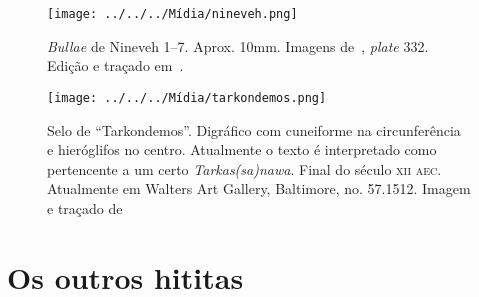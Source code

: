 \documentclass[article]{luvita}
\begin{document}
\begin{figure}[htb]
	\begin{center}
		\texttt{[image: ../../../Mídia/nineveh.png]}
	\end{center}
	\caption{\emph{Bullae} de Nineveh 1--7. Aprox. 10mm. Imagens
		de~, \emph{plate} 332. Edição e traçado
		em~.}\label{fig:nineveh}
\end{figure}

\begin{figure}[htb]
	\begin{center}
		\texttt{[image: ../../../Mídia/tarkondemos.png]}
	\end{center}
	\caption{Selo de ``Tarkondemos''. Digráfico com cuneiforme na circunferência e
		hieróglifos no centro. Atualmente o texto é interpretado como pertencente a
		um certo \emph{Tarkas{(sa)}nawa}. Final do século \textsc{xii aec}.
		Atualmente em Walters Art Gallery, Baltimore, no. 57.1512.
		Imagem e traçado de~\citet[p. 45f.; \emph{plate} 32]{CHLI3}
	}\label{fig:tarkondemos}
\end{figure}

\clearpage
\section{Os outros hititas}
\end{document}
